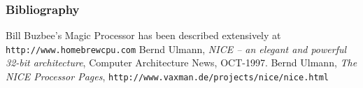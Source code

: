 \documentclass{beamer}
\begin{document}
%
 \begin{frame}
  \frametitle{Bibliography}
  \begin{thebibliography}{9}
    Bill Buzbee's Magic Processor has been described extensively at 
    {\tt http://www.homebrewcpu.com}
    Bernd Ulmann, \emph{NICE -- an elegant and powerful 32-bit architecture},
    Computer Architecture News, OCT-1997.
    Bernd Ulmann, \emph{The NICE Processor Pages}, 
    {\tt http://www.vaxman.de/projects/nice/nice.html}
  \end{thebibliography}
 \end{frame}
\end{document}
